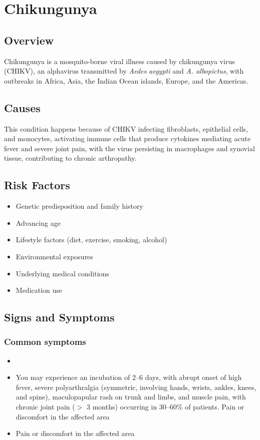\chapter{Chikungunya}
\label{sec:Chikungunya}

\section{Overview}
Chikungunya is a mosquito-borne viral illness caused by chikungunya virus (CHIKV), an alphavirus transmitted by \textit{Aedes aegypti} and \textit{A. albopictus}, with outbreaks in Africa, Asia, the Indian Ocean islands, Europe, and the Americas.
\section{Causes}
This condition happens because of CHIKV infecting fibroblasts, epithelial cells, and monocytes, activating immune cells that produce cytokines mediating acute fever and severe joint pain, with the virus persisting in macrophages and synovial tissue, contributing to chronic arthropathy.     
\section{Risk Factors}

\begin{itemize}[noitemsep]
  \item Genetic predisposition and family history
  \item Advancing age
  \item Lifestyle factors (diet, exercise, smoking, alcohol)
  \item Environmental exposures
  \item Underlying medical conditions
  \item Medication use
\end{itemize}
\section{Signs and Symptoms}

\subsection{Common symptoms}
\begin{itemize}[noitemsep]
  \item \item You may experience an incubation of 2--6 days, with abrupt onset of high fever, severe polyarthralgia (symmetric, involving hands, wrists, ankles, knees, and spine), maculopapular rash on trunk and limbs, and muscle pain, with chronic joint pain ($>$ 3 months) occurring in 30--60\% of patients. Pain or discomfort in the affected area    \item Pain or discomfort in the affected area
  \end{itemize}

